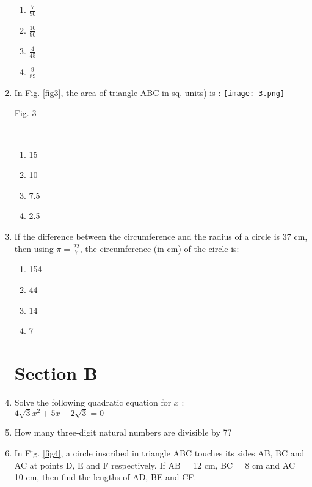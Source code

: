 \documentclass[journal,12pt,twocolumn]{IEEEtran}
\renewcommand\thesection{\arabic{section}}
\begin{document}
\begin{enumerate}[label=\thesection.\arabic*.,ref=\thesection.\theenumi]
 \begin{enumerate}[A]
    \item $\frac{7}{90}$\\
    \item $\frac{10}{90}$\\
    \item $\frac{4}{45}$\\
    \item $\frac{9}{89}$
 \end{enumerate}
\item In Fig. \ref{fig3}, the area of triangle ABC in sq. units) is :
\texttt{[image: 3.png]}\\{\centering
\caption{Fig. 3}\\}
\label{fig3}
 \begin{enumerate}[A]
    \item 15\\
    \item 10\\
    \item 7.5\\
    \item 2.5
 \end{enumerate}
\item If the difference between the circumference and the radius of a circle is 37 cm, then using $\pi=\frac{22}{7}$, the circumference (in cm) of the circle is:
 \begin{enumerate}[A]
    \item 154\\
    \item 44\\
    \item 14\\
    \item 7
 \end{enumerate}
\section{Section B}
\item Solve the following quadratic equation for $x$ :\\ $4\sqrt{3}x^2+5x-2\sqrt{3}=0$
\item How many three-digit natural numbers are divisible by 7?
\item In Fig. \ref{fig4}, a circle inscribed in triangle ABC touches its sides AB, BC and AC at points D, E and F respectively. If AB = 12 cm, BC = 8 cm and AC = 10 cm, then find the lengths of AD, BE and CF.


\end{enumerate}
\end{document}
